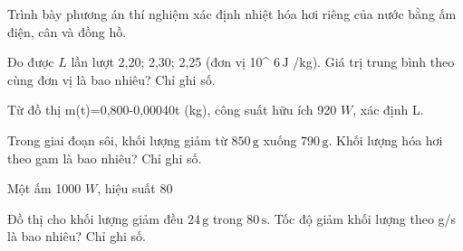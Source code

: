 \begin{bt}
Trình bày phương án thí nghiệm xác định nhiệt hóa hơi riêng của nước bằng ấm điện, cân và đồng hồ.
\end{bt}

\begin{ex}
Đo được $L$ lần lượt 2,20; 2,30; 2,25 (đơn vị 10^ $6\,\text{J}$ /kg). Giá trị trung bình theo cùng đơn vị là bao nhiêu? Chỉ ghi số.
\end{ex}

\begin{bt}
Từ đồ thị m(t)=0,800-0,00040t (kg), công suất hữu ích 920 $W$, xác định L.
\end{bt}

\begin{ex}
Trong giai đoạn sôi, khối lượng giảm từ $850\,\text{g}$ xuống $790\,\text{g}$. Khối lượng hóa hơi theo gam là bao nhiêu? Chỉ ghi số.
\end{ex}

\begin{bt}
Một ấm 1000 $W$, hiệu suất 80%
\end{bt}

\begin{ex}
Đồ thị cho khối lượng giảm đều $24\,\text{g}$ trong $80\,\text{s}$. Tốc độ giảm khối lượng theo g/s là bao nhiêu? Chỉ ghi số.
\end{ex}

